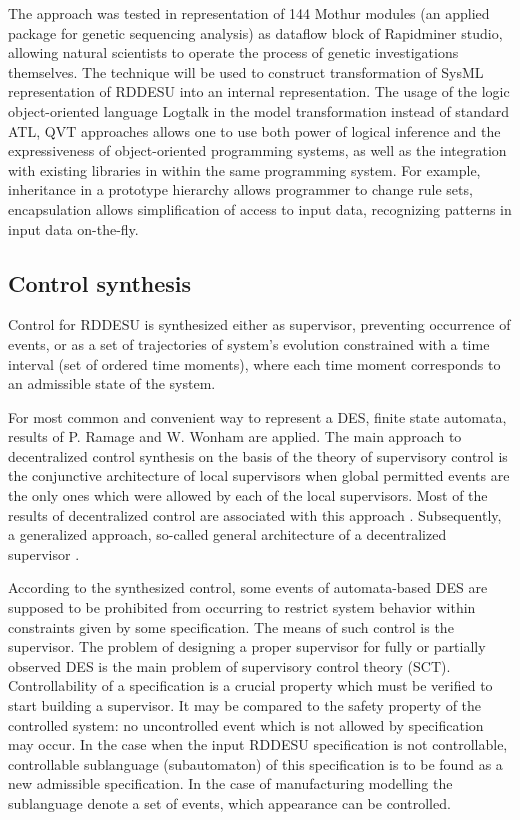 \documentclass[conference]{IEEEtran}
\begin{document}
The approach was tested in representation of 144 Mothur modules (an applied package for genetic sequencing analysis) as dataflow block of Rapidminer studio, allowing natural scientists to operate the process of genetic investigations themselves. The technique will be used to construct transformation of SysML representation of RDDESU into an internal representation. The usage of the logic object-oriented language Logtalk in the model transformation instead of standard ATL, QVT approaches allows one to use both power of logical inference and the expressiveness of object-oriented programming systems, as well as the integration with existing libraries in within the same programming system. For example, inheritance in a prototype hierarchy allows programmer to change rule sets, encapsulation allows simplification of access to input data, recognizing patterns in input data on-the-fly.

\subsection{Control synthesis}
\label{sec:sub-control-syn}

Control for RDDESU is synthesized either as supervisor, preventing occurrence of events, or as a set of trajectories of system’s evolution constrained with a time interval (set of ordered time moments), where each time moment corresponds to an admissible state of the system.

For most common and convenient way to represent a DES, finite state automata, results of P. Ramage and W. Wonham \cite{whoam} are applied. The main approach to decentralized control synthesis on the basis of the theory of supervisory control is the conjunctive architecture of local supervisors when global permitted events are the only ones which were allowed by each of the local supervisors. Most of the results of decentralized control are associated with this approach \cite{whoam}. Subsequently, a generalized approach, so-called general architecture of a decentralized supervisor \cite{tsyoo}.

According to the synthesized control, some events of automata-based DES are supposed to be prohibited from occurring to restrict system behavior within constraints given by some specification. The means of such control is the supervisor. The problem of designing a proper supervisor for fully or partially observed DES is the main problem of supervisory control theory (SCT). Controllability of a specification is a crucial property which must be verified to start building a supervisor. It may be compared to the safety property of the controlled system: no uncontrolled event which is not allowed by specification may occur. In the case when the input RDDESU specification is not controllable, controllable sublanguage (subautomaton) of this specification is to be found as a new admissible specification. In the case of manufacturing modelling the sublanguage denote a set of events, which appearance can be controlled. %
\end{document}

